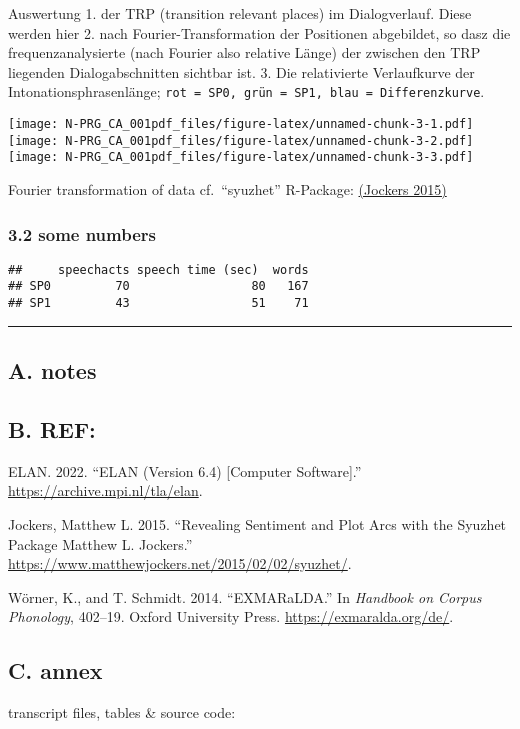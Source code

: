 \documentclass[
]{article}
\newlength{\cslhangindent}
\newlength{\cslentryspacingunit} %
\newenvironment{CSLReferences}[2] %
 {%
  \setlength{\parindent}{0pt}
  \ifodd #1
  \let\oldpar\par
  \def\par{\hangindent=\cslhangindent\oldpar}
  \fi
  \setlength{\parskip}{#2\cslentryspacingunit}
 }%
 {}
\begin{document}
Auswertung 1. der TRP (transition relevant places) im Dialogverlauf.
Diese werden hier 2. nach Fourier-Transformation der Positionen
abgebildet, so dasz die frequenzanalysierte (nach Fourier also relative
Länge) der zwischen den TRP liegenden Dialogabschnitten sichtbar ist. 3.
Die relativierte Verlaufkurve der Intonationsphrasenlänge;
\texttt{rot\ =\ SP0,\ grün\ =\ SP1,\ blau\ =\ Differenzkurve}.

\texttt{[image: N-PRG\_CA\_001pdf\_files/figure-latex/unnamed-chunk-3-1.pdf]}
\texttt{[image: N-PRG\_CA\_001pdf\_files/figure-latex/unnamed-chunk-3-2.pdf]}
\texttt{[image: N-PRG\_CA\_001pdf\_files/figure-latex/unnamed-chunk-3-3.pdf]}

Fourier transformation of data cf.~``syuzhet'' R-Package:
\href{https://www.matthewjockers.net/2015/02/02/syuzhet/}{(Jockers
2015)}

\hypertarget{some-numbers}{%
\subsubsection{3.2 some numbers}\label{some-numbers}}

\begin{verbatim}
##     speechacts speech time (sec)  words
## SP0         70                 80   167
## SP1         43                 51    71
\end{verbatim}

\begin{center}\rule{0.5\linewidth}{0.5pt}\end{center}

\hypertarget{a.-notes}{%
\subsection{A. notes}\label{a.-notes}}

\hypertarget{b.-ref}{%
\subsection{B. REF:}\label{b.-ref}}

\hypertarget{refs}{}
\begin{CSLReferences}{1}{0}
\leavevmode{}%
ELAN. 2022. {``{ELAN} ({Version} 6.4) {[}{Computer} Software{]}.''}
\url{https://archive.mpi.nl/tla/elan}.

\leavevmode{}%
Jockers, Matthew L. 2015. {``Revealing {Sentiment} and {Plot} {Arcs}
with the {Syuzhet} {Package} {Matthew} {L}. {Jockers}.''}
\url{https://www.matthewjockers.net/2015/02/02/syuzhet/}.

\leavevmode{}%
Wörner, K., and T. Schmidt. 2014. {``{EXMARaLDA}.''} In \emph{Handbook
on {Corpus} {Phonology}}, 402--19. Oxford University Press.
\url{https://exmaralda.org/de/}.

\end{CSLReferences}

\hypertarget{c.-annex}{%
\subsection{C. annex}\label{c.-annex}}

transcript files, tables \& source code:
\end{document}
